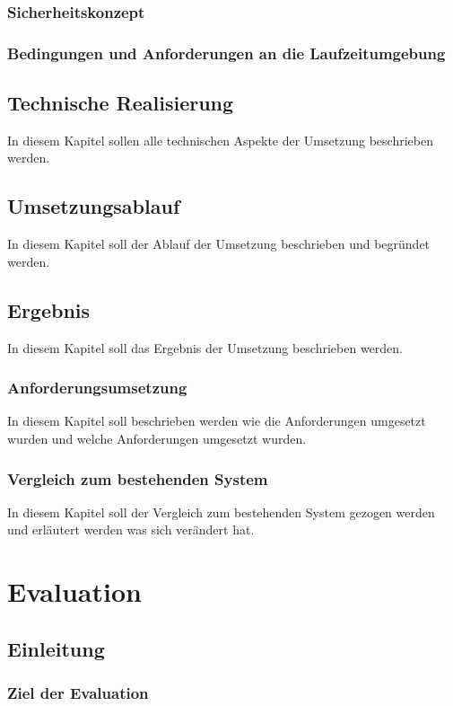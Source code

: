 \documentclass[a4paper,10pt,twoside]{report}
\begin{document}
\subsection{Sicherheitskonzept}
\subsection{Bedingungen und Anforderungen an die Laufzeitumgebung}

\section{Technische Realisierung}
In diesem Kapitel sollen alle technischen Aspekte der Umsetzung beschrieben werden.
\section{Umsetzungsablauf}
In diesem Kapitel soll der Ablauf der Umsetzung beschrieben und begründet werden.
\section{Ergebnis}
In diesem Kapitel soll das Ergebnis der Umsetzung beschrieben werden.
\subsection{Anforderungsumsetzung}
In diesem Kapitel soll beschrieben werden wie die Anforderungen umgesetzt wurden und welche Anforderungen umgesetzt wurden.
\subsection{Vergleich zum bestehenden System}
In diesem Kapitel soll der Vergleich zum bestehenden System gezogen werden und erläutert werden was sich verändert hat.



\chapter{Evaluation}

\section{Einleitung}
\subsection{Ziel der Evaluation}
\end{document}
